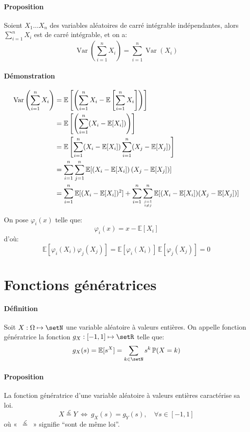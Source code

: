 \documentclass[a4paper,10pt,french,openany]{memoir}
\newcommand{\Proba}{\mathbb{P}}
\newcommand{\Esper}{\mathbb{E}}
\newcommand{\laweq}{\overset{\mathcal L}=}
\DeclareMathOperator{\Var}{Var}
\begin{document}
\paragraph{Proposition}
Soient $X_1\dots X_n$ des variables aléatoires de carré intégrable indépendantes, alors $\sum_{i=1}^n X_i$ est de carré intégrable, et on a:
\[\Var \left(\sum_{i=1}^n X_i\right) = \sum_{i=1}^n \Var(X_i)\]

\paragraph{Démonstration}
\begin{align*}
 \Var \left(\sum_{i=1}^n X_i\right) &= \Esper\left[\left(\sum_{i=1}^n X_i - \Esper\left[\sum_{i=1}^n X_i\right]\right)\right] \\
    &= \Esper\left[\left(\sum_{i=1}^n (X_i - \Esper[X_i])\right)\right] \\
    &= \Esper\left[\sum_{i=1}^n (X_i - \Esper[X_i]) \sum_{i=1}^n (X_j - \Esper[X_j])\right] \\
    &= \sum_{i=1}^n \sum_{j=1}^n \Esper[(X_i - \Esper[X_i])\,(X_j - \Esper[X_j])] \\
    &= \sum_{i=1}^n \Esper[(X_i - \Esper[X_i])^2] + \sum_{i=1}^n \sum_{\genfrac{}{}{0pt}{}{j=1}{i\neq j}}^n \Esper[(X_i - \Esper[X_i])(X_j - \Esper[X_j])]
\end{align*}

On pose $\varphi_i(x)$ telle que:
\[\varphi_i(x) = x - \Esper[X_i]\]
d'où:
\[\Esper[\varphi_i(X_i) \varphi_j(X_j)] = \Esper[\varphi_i(X_i)] \, \Esper[\varphi_j(X_j)] = 0\]

\section{Fonctions génératrices}

\paragraph{Définition}
Soit $X: \Omega \mapsto \setN$ une variable aléatoire à valeurs entières. On appelle fonction génératrice la fonction $g_X:[-1,1]\mapsto\setR$ telle que:
\[g_X(s)=\Esper[s^X]=\sum_{k\in \setN} s^k\,\Proba(X=k)\]

\paragraph{Proposition}
La fonction génératrice d'une variable aléatoire à valeurs entières caractérise sa loi.
\[ X \laweq Y \:\Leftrightarrow\: g_X(s)=g_Y(s), \quad\forall s\in [-1,1] \]
où «~$\laweq$~» signifie ``sont de même loi''.
\end{document}
